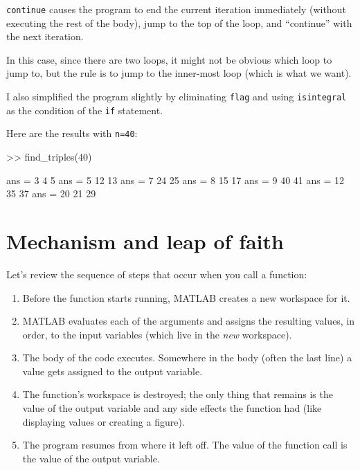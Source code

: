 \documentclass[
]{book}
\numberwithin{Answer}{chapter}
\numberwithin{Exercise}{chapter}
\begin{document}
{\tt continue} causes the program to end the current iteration
immediately (without executing the rest of the body), jump to
the top of the loop, and ``continue'' with the next iteration.

In this case, since there are two loops, it might not be obvious
which loop to jump to, but the rule is to jump to the inner-most
loop (which is what we want).

I also simplified the program slightly by eliminating
{\tt flag} and using {\tt isintegral} as the condition of the
{\tt if} statement.

Here are the results with {\tt n=40}:

\begin{code}
>> find_triples(40)

ans =  3     4     5
ans =  5    12    13
ans =  7    24    25
ans =  8    15    17
ans =  9    40    41
ans = 12    35    37
ans = 20    21    29
\end{code}




\section{Mechanism and leap of faith}

Let's review the sequence of steps that occur when you call a function:

\begin{enumerate}

\item Before the function starts running, MATLAB creates a new
workspace for it.

\item MATLAB evaluates each of the arguments and assigns
the resulting values, in order, to the input variables (which
live in the {\em new} workspace).

\item The body of the code executes.  Somewhere in the body
(often the last line) a value gets assigned to the output variable.

\item The function's workspace is destroyed; the only thing
that remains is the value of the output variable and any side
effects the function had (like displaying values or creating
a figure).

\item The program resumes from where it left off.  The value
of the function call is the value of the output variable.

\end{enumerate}
\end{document}
